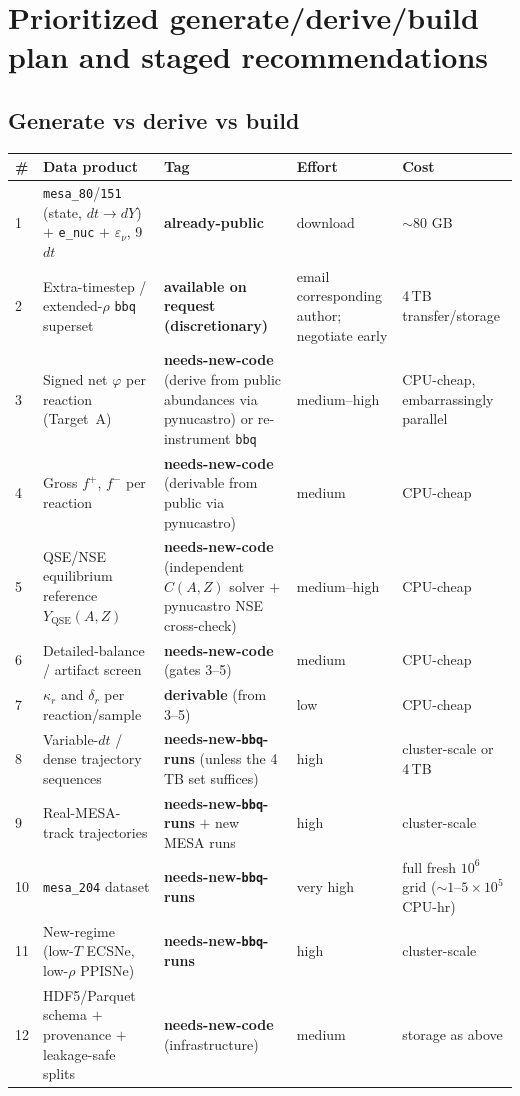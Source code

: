 \documentclass[11pt]{article}
\newcommand{\bbq}{\texttt{bbq}}
\begin{document}
\section{Prioritized generate/derive/build plan and staged recommendations}

\subsection{Generate vs derive vs build}

{\footnotesize\setlength{\tabcolsep}{4pt}
\begin{longtable}{p{0.4cm}p{4.0cm}p{4.3cm}p{1.7cm}p{3.2cm}}
\toprule
\textbf{\#} & \textbf{Data product} & \textbf{Tag} & \textbf{Effort} & \textbf{Cost} \\
\midrule
\endhead
1 & \texttt{mesa\_80}/\texttt{151} (state, $dt \to dY$) $+$ \texttt{e\_nuc} $+$ $\varepsilon_\nu$, 9 $dt$ & \textbf{already-public} & download & $\sim$80 GB \\
2 & Extra-timestep / extended-$\rho$ \bbq{} superset & \textbf{available on request (discretionary)} & email corresponding author; negotiate early & 4\,TB transfer/storage \\
3 & Signed net $\varphi$ per reaction (Target~A) & \textbf{needs-new-code} (derive from public abundances via pynucastro) or re-instrument \bbq{} & medium--high & CPU-cheap, embarrassingly parallel \\
4 & Gross $f^+$, $f^-$ per reaction & \textbf{needs-new-code} (derivable from public via pynucastro) & medium & CPU-cheap \\
5 & QSE/NSE equilibrium reference $Y_{\mathrm{QSE}}(A,Z)$ & \textbf{needs-new-code} (independent $C(A,Z)$ solver $+$ pynucastro NSE cross-check) & medium--high & CPU-cheap \\
6 & Detailed-balance / artifact screen & \textbf{needs-new-code} (gates 3--5) & medium & CPU-cheap \\
7 & $\kappa_r$ and $\delta_r$ per reaction/sample & \textbf{derivable} (from 3--5) & low & CPU-cheap \\
8 & Variable-$dt$ / dense trajectory sequences & \textbf{needs-new-\bbq{}-runs} (unless the 4\,TB set suffices) & high & cluster-scale or 4\,TB \\
9 & Real-MESA-track trajectories & \textbf{needs-new-\bbq{}-runs} $+$ new MESA runs & high & cluster-scale \\
10 & \texttt{mesa\_204} dataset & \textbf{needs-new-\bbq{}-runs} & very high & full fresh $10^6$ grid ($\sim 1$--$5\times 10^5$ CPU-hr) \\
11 & New-regime (low-$T$ ECSNe, low-$\rho$ PPISNe) & \textbf{needs-new-\bbq{}-runs} & high & cluster-scale \\
12 & HDF5/Parquet schema $+$ provenance $+$ leakage-safe splits & \textbf{needs-new-code} (infrastructure) & medium & storage as above \\
\bottomrule
\end{longtable}}
\end{document}
